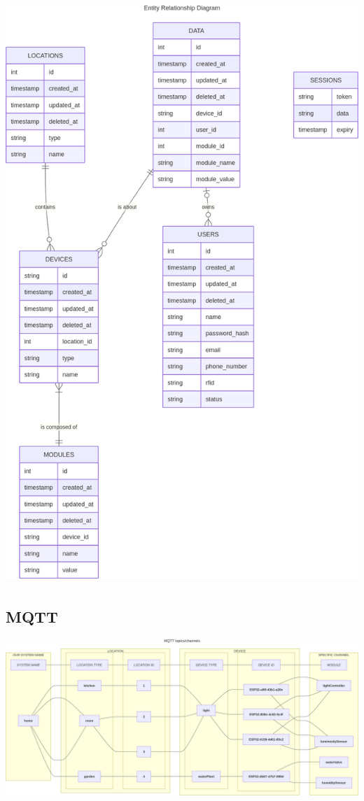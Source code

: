 \documentclass{report}
\begin{document}
            \includegraphics[height=22cm]{ui/assets/img/database}

        \subsection{MQTT}\label{subsec:mqtt}

            \includegraphics[width=17cm]{ui/assets/img/mqtt-topics}
\end{document}
